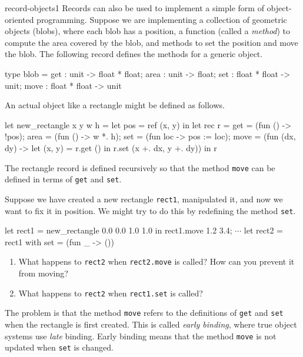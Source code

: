 %
\begin{exercise}{record-objects1}
Records can also be used to implement a simple form of object-oriented programming.  Suppose we are
implementing a collection of geometric objects (blobs), where each blob has a position, a function (called a \emph{method}) to
compute the area covered by the blob, and methods to set the position and move the blob.  The
following record defines the methods for a generic object.

\begin{ocaml}
type blob =
   { get    : unit -> float * float;
     area   : unit -> float;
     set    : float * float -> unit;
     move   : float * float -> unit
   }
\end{ocaml}
%
An actual object like a rectangle might be defined as follows.

\begin{ocaml}
let new_rectangle x y w h =
   let pos = ref (x, y) in
   let rec r =
      { get  = (fun () -> !pos);
        area = (fun () -> w *. h);
        set  = (fun loc -> pos := loc);
        move = (fun (dx, dy) ->
                   let (x, y) = r.get () in
                   r.set (x +. dx, y +. dy))
      }
   in
   r
\end{ocaml}
%
The rectangle record is defined recursively so that the method \hbox{\lstinline/move/} can be defined in
terms of \hbox{\lstinline/get/} and \hbox{\lstinline/set/}.

Suppose we have created a new rectangle \hbox{\lstinline/rect1/}, manipulated it, and now we want to fix it
in position.  We might try to do this by redefining the method \hbox{\lstinline/set/}.

\begin{ocaml}
let rect1 = new_rectangle 0.0 0.0 1.0 1.0 in
rect1.move 1.2 3.4; $\cdots$
let rect2 = { rect1 with set = (fun _ -> ()) }
\end{ocaml}
%
\begin{enumerate}
\item What happens to \hbox{\lstinline/rect2/} when \hbox{\lstinline/rect2.move/} is called?  How can you prevent it from moving?
\item What happens to \hbox{\lstinline/rect2/} when \hbox{\lstinline/rect1.set/} is called?
\end{enumerate}

\begin{answer}\ifanswers
The problem is that the method \hbox{\lstinline/move/} refers to the definitions of \hbox{\lstinline/get/} and
\hbox{\lstinline/set/} when the rectangle is first created.  This is called \emph{early binding}, where
true object systems use \emph{late} binding.  Early binding means that the method \hbox{\lstinline/move/}
is not updated when \hbox{\lstinline/set/} is changed.


\end{answer}
\end{exercise}
